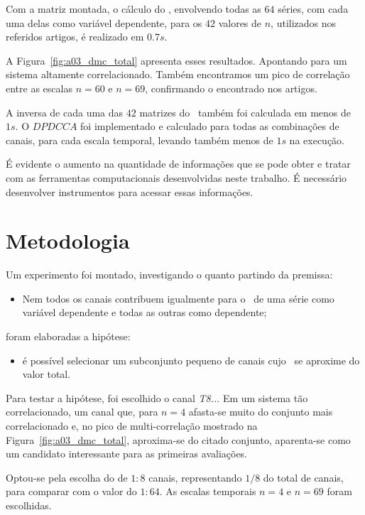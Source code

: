 Com a matriz montada, o cálculo do \dmc, envolvendo todas as $64$ séries, com cada uma delas como variável dependente, para os $42$ valores de $n$, utilizados nos referidos artigos, é realizado em $0.7s$.

A Figura~\ref{fig:a03_dmc_total} apresenta esses resultados. Apontando para um sistema altamente correlacionado. Também encontramos um pico de correlação entre as escalas $n=60$ e $n=69$, confirmando o encontrado nos artigos.

A inversa de cada uma das $42$ matrizes do \pdcca~também foi calculada em menos de $1s$. O $DPDCCA$ foi implementado e calculado para todas as combinações de canais, para cada escala temporal, levando também menos de $1s$ na execução.

É evidente o aumento na quantidade de informações que se pode obter e tratar com as ferramentas computacionais desenvolvidas neste trabalho. É necessário desenvolver instrumentos para acessar essas informações.



 

\section{Metodologia}

Um experimento foi montado, investigando o quanto partindo da premissa:

\begin{itemize}
  \item Nem todos os canais contribuem igualmente para o \dmc~de uma série como variável dependente e todas as outras como dependente;

\end{itemize}

foram elaboradas a hipótese:

\begin{itemize}
  \item é possível selecionar um subconjunto pequeno de canais cujo \dmc~se aproxime do valor total.
\end{itemize}

Para testar a hipótese, foi escolhido o canal \emph{T8..}. Em um sistema tão correlacionado, um canal que, para $n=4$ afasta-se muito do conjunto mais correlacionado e, no pico de multi-correlação mostrado na Figura~\ref{fig:a03_dmc_total}, aproxima-se do citado conjunto, aparenta-se como um candidato interessante para as primeiras avaliações.

Optou-se pela escolha do \dmc de $1:8$ canais, representando $1/8$ do total de canais, para comparar com o valor do \dmc$1:64$. As escalas temporais $n=4$ e $n=69$ foram escolhidas.

